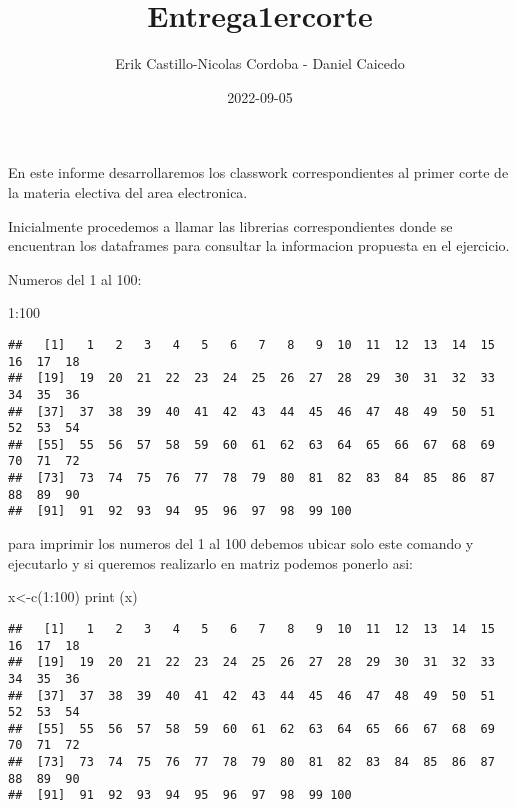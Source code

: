 \documentclass[
]{article}
\title{Entrega1ercorte}
\author{Erik Castillo-Nicolas Cordoba - Daniel Caicedo}
\date{2022-09-05}
\newenvironment{Shaded}{\begin{snugshade}}{\end{snugshade}}
\newcommand{\DecValTok}[1]{\textcolor[rgb]{0.00,0.00,0.81}{#1}}
\newcommand{\FunctionTok}[1]{\textcolor[rgb]{0.00,0.00,0.00}{#1}}
\newcommand{\NormalTok}[1]{#1}
\newcommand{\OtherTok}[1]{\textcolor[rgb]{0.56,0.35,0.01}{#1}}
\newcommand{\SpecialCharTok}[1]{\textcolor[rgb]{0.00,0.00,0.00}{#1}}
\begin{document}
\maketitle

En este informe desarrollaremos los classwork correspondientes al primer
corte de la materia electiva del area electronica.

Inicialmente procedemos a llamar las librerias correspondientes donde se
encuentran los dataframes para consultar la informacion propuesta en el
ejercicio.

Numeros del 1 al 100:

\begin{Shaded}
\begin{Highlighting}[]
\DecValTok{1}\SpecialCharTok{:}\DecValTok{100}
\end{Highlighting}
\end{Shaded}

\begin{verbatim}
##   [1]   1   2   3   4   5   6   7   8   9  10  11  12  13  14  15  16  17  18
##  [19]  19  20  21  22  23  24  25  26  27  28  29  30  31  32  33  34  35  36
##  [37]  37  38  39  40  41  42  43  44  45  46  47  48  49  50  51  52  53  54
##  [55]  55  56  57  58  59  60  61  62  63  64  65  66  67  68  69  70  71  72
##  [73]  73  74  75  76  77  78  79  80  81  82  83  84  85  86  87  88  89  90
##  [91]  91  92  93  94  95  96  97  98  99 100
\end{verbatim}

para imprimir los numeros del 1 al 100 debemos ubicar solo este comando
y ejecutarlo y si queremos realizarlo en matriz podemos ponerlo asi:

\begin{Shaded}
\begin{Highlighting}[]
\NormalTok{x}\OtherTok{\textless{}{-}}\FunctionTok{c}\NormalTok{(}\DecValTok{1}\SpecialCharTok{:}\DecValTok{100}\NormalTok{)}
\FunctionTok{print}\NormalTok{ (x)}
\end{Highlighting}
\end{Shaded}

\begin{verbatim}
##   [1]   1   2   3   4   5   6   7   8   9  10  11  12  13  14  15  16  17  18
##  [19]  19  20  21  22  23  24  25  26  27  28  29  30  31  32  33  34  35  36
##  [37]  37  38  39  40  41  42  43  44  45  46  47  48  49  50  51  52  53  54
##  [55]  55  56  57  58  59  60  61  62  63  64  65  66  67  68  69  70  71  72
##  [73]  73  74  75  76  77  78  79  80  81  82  83  84  85  86  87  88  89  90
##  [91]  91  92  93  94  95  96  97  98  99 100
\end{verbatim}
\end{document}
